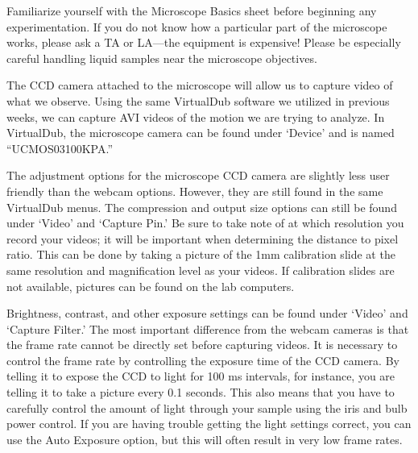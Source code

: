Familiarize yourself with the Microscope Basics sheet before beginning any experimentation. 
If you do not know how a particular part of the microscope works, please ask a TA or LA—the equipment is expensive! 
Please be especially careful handling liquid samples near the microscope objectives. 
\par 
The CCD camera attached to the microscope will allow us to capture video of what we observe. 
Using the same VirtualDub software we utilized in previous weeks, we can capture AVI videos of the motion we are trying to analyze. 
In VirtualDub, the microscope camera can be found under ‘Device’ and is named ``UCMOS03100KPA.'' 
\par 
The adjustment options for the microscope CCD camera are slightly less user friendly than the webcam options. 
However, they are still found in the same VirtualDub menus. 
The compression and output size options can still be found under ‘Video’ and ‘Capture Pin.’ 
Be sure to take note of at which resolution you record your videos; it will be important when determining the distance to pixel ratio. 
This can be done by taking a picture of the 1mm calibration slide at the same resolution and magnification level as your videos. 
If calibration slides are not available, pictures can be found on the lab computers. 
\par 
Brightness, contrast, and other exposure settings can be found under ‘Video’ and ‘Capture Filter.’ 
The most important difference from the webcam cameras is that the frame rate cannot be directly set before capturing videos. 
It is necessary to control the frame rate by controlling the exposure time of the CCD camera. 
By telling it to expose the CCD to light for 100 ms intervals, for instance, you are telling it to take a picture every 0.1 seconds. 
This also means that you have to carefully control the amount of light through your sample using the iris and bulb power control. 
If you are having trouble getting the light settings correct, you can use the Auto Exposure option, but this will often result in very low frame rates.
%
